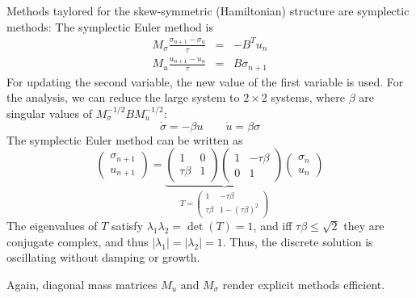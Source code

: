 Methods taylored for the skew-symmetric (Hamiltonian) structure are symplectic methods: The symplectic Euler method is
\begin{eqnarray*}
M_\sigma  \frac{\sigma_{n+1} - \sigma_n}{\tau} & =  & - B^T u_n \\
M_u \frac{u_{n+1} - u_n}{\tau} & = & B \sigma_{n+1}
\end{eqnarray*}
For updating the second variable, the new value of the first variable is used. For the analysis, we can reduce the large system to $2 \times 2$ systems, where $\beta$ are singular values of $M^{-1/2}_\sigma B M^{-1/2}_u$:
$$
\dot \sigma = -\beta u \qquad \dot u = \beta \sigma
$$
The symplectic Euler method can be written as
$$
\left( \begin{array}{c} \sigma_{n+1} \\ u_{n+1} \end{array} \right) = 
\underbrace{
\left( \begin{array}{cc} 1 & 0 \\ \tau \beta & 1 \end{array} \right) 
\left( \begin{array}{cc} 1 & -\tau \beta \\ 0 & 1 \end{array} \right) 
}_{T = \left( \begin{array}{cc} 1 & -\tau \beta \\ \tau \beta & 1 - (\tau \beta)^2  \end{array} \right) }
\left( \begin{array}{c} \sigma_{n} \\ u_{n} \end{array} \right) 
$$
The eigenvalues of $T$ satisfy $\lambda_1 \lambda_2 = \operatorname{det} (T) = 1$, and iff $\tau \beta \leq \sqrt{2}$ they are conjugate complex, and thus $|\lambda_1| = | \lambda_2 | = 1$. Thus, the discrete solution is oscillating without damping or growth.

Again, diagonal mass matrices $M_u$ and $M_{\sigma}$ render explicit methods efficient.

